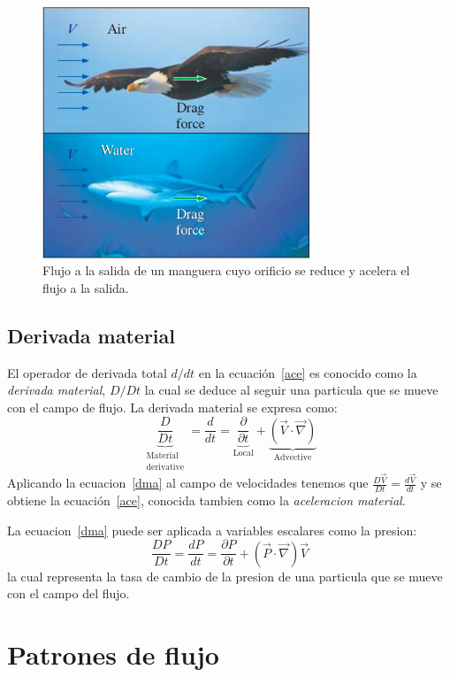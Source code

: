 \documentclass[10pt, oneside]{article}
\begin{document}
\begin{figure}[h]
\centering
\includegraphics[width=8cm]{visco0}
\caption{Flujo a la salida de un manguera cuyo orificio se reduce y acelera el flujo a la salida.}
\label{acel}
\end{figure}

\subsection{Derivada material}
El operador de derivada total $d/dt$ en la ecuaci\'on~\ref{ace} es conocido como la \emph{derivada material}, $D/Dt$ la cual se deduce al seguir una  particula que se mueve con el campo de flujo. La derivada material se expresa como:
\begin{equation}
\underbrace{\frac{D}{Dt}}_{\substack{\text{Material} \\ \text{derivative}}} = \frac{d}{dt} = \underbrace{\frac{\partial}{\partial t}}_{\text{Local}} + \underbrace{(\vec{V} \cdot \vec{\nabla})}_{\text{Advective}}
\label{dma}
\end{equation}
Aplicando la ecuacion~\ref{dma} al campo de velocidades tenemos que $\frac{D\vec{V}}{Dt} = \frac{d\vec{V}}{dt}$ y se obtiene la ecuaci\'on~\ref{ace}, conocida tambien como la \emph{aceleracion material}.

La ecuacion~\ref{dma} puede ser aplicada a variables escalares como la presion:
$$
\frac{DP}{Dt}=\frac{dP}{dt}=\frac{\partial P}{\partial t} + (\vec{P} \cdot \vec{\nabla})\vec{V}
$$
la cual representa la tasa de cambio de la presion  de una particula que se mueve con el campo del flujo. 

\section{Patrones de flujo}
\end{document}
